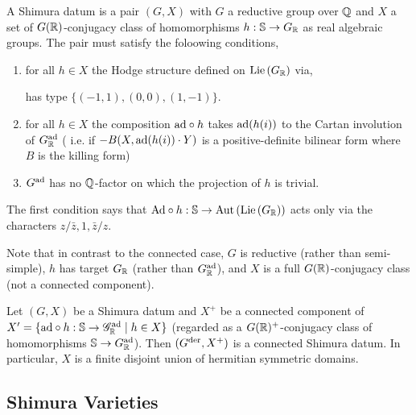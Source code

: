 \documentclass[12pt]{article}
\begin{document}
\begin{definition}
A Shimura datum is a pair $(G, X)$ with $G$ a reductive group over $\mathbb{Q}$ and $X$ a set of $G(\mathbb{R})$-conjugacy class of homomorphisms $h : \mathbb{S} \to G_{\mathbb{R}}$ as real algebraic groups. The pair must satisfy the foloowing conditions,
\begin{enumerate}
\item for all $h \in X$ the Hodge structure defined on $\mathrm{Lie}\left( G_{\mathbb{R}} \right)$ via,
\begin{center}
\end{center}
has type $\{(-1,1), (0,0), (1,-1) \}$.
\item for all $h \in X$ the composition $\mathrm{ad} \circ h$ takes $\mathrm{ad}(h(i))$ to the Cartan involution of $G_{\mathbb{R}}^{\mathrm{ad}}$ ( i.e. if $-B(X, \mathrm{ad}(h(i)) \cdot Y)$ is a positive-definite bilinear form where $B$ is the killing form)
\item $G^{\mathrm{ad}}$ has no $\mathbb{Q}$-factor on which the projection of $h$ is trivial.
\end{enumerate}
\end{definition}


\begin{rmk}
The first condition says that $\mathrm{Ad} \circ h : \mathbb{S} \to \mathrm{Aut} \left( \mathrm{Lie}\left( G_{\mathbb{R}} \right) \right)$ acts only via the characters $z / \bar{z}, 1, \bar{z}/z$. 
\end{rmk}

\begin{rmk}
Note that in contrast to the connected case, $G$ is reductive (rather than semi-simple), $h$ has target $G_{\mathbb{R}}$ (rather than $G_{\mathbb{R}}^{\mathrm{ad}}$), and $X$ is a full $G(\mathbb{R})$-conjugacy class (not a connected component).
\end{rmk}

\begin{proposition}
Let $(G, X)$ be a Shimura datum and $X^+$ be a connected component of $X' = \{\mathrm{ad} \circ h : \mathbb{S} \to \mathscr{G}_{\mathbb{R}}^{\mathrm{ad}} \mid h \in X \}$ (regarded as a $G(\mathbb{R})^+$-conjugacy class  of homomorphisms $\mathbb{S} \to G_{\mathbb{R}}^{\mathrm{ad}}$). Then $(G^{\mathrm{der}}, X^+)$ is a connected Shimura datum. In particular, $X$ is a finite disjoint union of hermitian symmetric domains. 
\end{proposition}

\subsection{Shimura Varieties}
\end{document}
